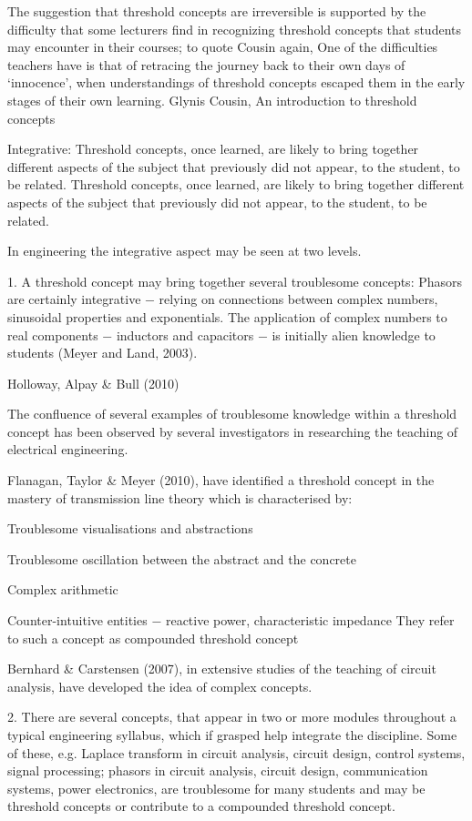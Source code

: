 \documentclass{tufte-book}\usepackage[]{graphicx}\usepackage[]{xcolor}
\begin{document}
The suggestion that threshold concepts are irreversible is supported by the difficulty that some lecturers find in recognizing threshold concepts that students may encounter in their courses; to quote Cousin again,
One of the difficulties teachers have is that of retracing the journey back to their own days of ‘innocence’, when understandings of threshold concepts escaped them in the early stages of their own learning.
                                    Glynis Cousin, An introduction to threshold concepts

Integrative: Threshold concepts, once learned, are likely to bring together different aspects of the subject that previously did not appear, to the student, to be related. Threshold concepts, once learned, are likely to bring together different aspects of the subject that previously did not appear, to the student, to be related.

In engineering the integrative aspect may be seen at two levels.

1.	A threshold concept may bring together several troublesome concepts:
Phasors are certainly integrative − relying on connections between complex numbers, sinusoidal properties and exponentials. The application of complex numbers to real components − inductors and capacitors − is initially alien knowledge to students (Meyer and Land, 2003).

Holloway, Alpay \& Bull (2010)

The confluence of several examples of troublesome knowledge within a threshold concept has been observed by several investigators in researching the teaching of electrical engineering.

Flanagan, Taylor \& Meyer (2010), have identified a threshold concept in the mastery of transmission line theory which is characterised by:

Troublesome visualisations and abstractions

Troublesome oscillation between the abstract and the concrete

Complex arithmetic

Counter-intuitive entities − reactive power, characteristic impedance
They refer to such a concept as compounded threshold concept

Bernhard \& Carstensen (2007), in extensive studies of the teaching of circuit analysis, have developed the idea of complex concepts.

2.	There are several concepts, that appear in two or more modules throughout a typical engineering syllabus, which if grasped help integrate the discipline. Some of these, e.g. Laplace transform in circuit analysis, circuit design, control systems, signal processing; phasors in circuit analysis, circuit design, communication systems, power electronics, are troublesome for many students and may be threshold concepts or contribute to a compounded threshold concept.
\end{document}
